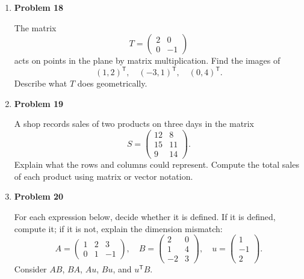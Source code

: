 \begin{enumerate}
\item \textbf{Problem 18}\par
The matrix
\[
T=\begin{pmatrix}2&0\\0&-1\end{pmatrix}
\]
acts on points in the plane by matrix multiplication. Find the images of
\[
(1,2)^{\mathsf T},\quad (-3,1)^{\mathsf T},\quad (0,4)^{\mathsf T}.
\]
Describe what \(T\) does geometrically.

\item \textbf{Problem 19}\par
A shop records sales of two products on three days in the matrix
\[
S=\begin{pmatrix}
12&8\\
15&11\\
9&14
\end{pmatrix}.
\]
Explain what the rows and columns could represent. Compute the total sales of each product using matrix or vector notation.

\item \textbf{Problem 20}\par
For each expression below, decide whether it is defined. If it is defined, compute it; if it is not, explain the dimension mismatch:
\[
A=\begin{pmatrix}1&2&3\\0&1&-1\end{pmatrix},
\quad
B=\begin{pmatrix}2&0\\1&4\\-2&3\end{pmatrix},
\quad
u=\begin{pmatrix}1\\-1\\2\end{pmatrix}.
\]
Consider \(AB\), \(BA\), \(Au\), \(Bu\), and \(u^{\mathsf T}B\).
\end{enumerate}
